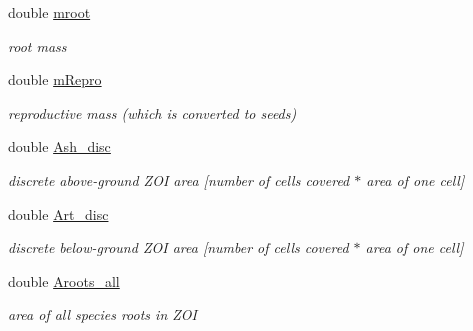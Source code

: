 \begin{DoxyCompactItemize}
\mbox{\label{class_c_plant_a3b1293200e1f09e278520105de1a67c8}} 
double \mbox{\hyperlink{class_c_plant_a3b1293200e1f09e278520105de1a67c8}{mroot}}
\begin{DoxyCompactList}\small\item\em root mass \end{DoxyCompactList}\item 
\mbox{\label{class_c_plant_a1e22d888338d37dfc7c86f87f005683a}} 
double \mbox{\hyperlink{class_c_plant_a1e22d888338d37dfc7c86f87f005683a}{m\+Repro}}
\begin{DoxyCompactList}\small\item\em reproductive mass (which is converted to seeds) \end{DoxyCompactList}\item 
\mbox{\label{class_c_plant_a134e8549742713b7c106e8ddcef2b372}} 
double \mbox{\hyperlink{class_c_plant_a134e8549742713b7c106e8ddcef2b372}{Ash\+\_\+disc}}
\begin{DoxyCompactList}\small\item\em discrete above-\/ground Z\+OI area \mbox{[}number of cells covered $\ast$ area of one cell\mbox{]} \end{DoxyCompactList}\item 
\mbox{\label{class_c_plant_acce1e7f485dd0b6a3f78931be402e4b3}} 
double \mbox{\hyperlink{class_c_plant_acce1e7f485dd0b6a3f78931be402e4b3}{Art\+\_\+disc}}
\begin{DoxyCompactList}\small\item\em discrete below-\/ground Z\+OI area \mbox{[}number of cells covered $\ast$ area of one cell\mbox{]} \end{DoxyCompactList}\item 
\mbox{\label{class_c_plant_a6f8811a202b607fe3c0b0fee1e3f9880}} 
double \mbox{\hyperlink{class_c_plant_a6f8811a202b607fe3c0b0fee1e3f9880}{Aroots\+\_\+all}}
\begin{DoxyCompactList}\small\item\em area of all species\textquotesingle{} roots in Z\+OI \end{DoxyCompactList}\item 
\mbox{\label{class_c_plant_a732da37520b82a5000e50c0b0699a136}} 

\end{DoxyCompactItemize}
